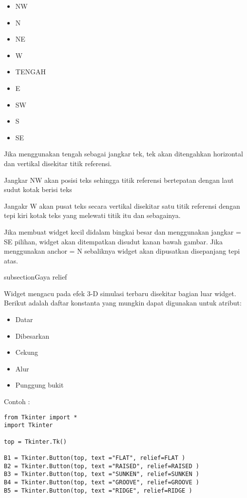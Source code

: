 \documentclass [12pt,a4paper,notitlepage,oneside,bahasa]{article}
\begin{document}
\begin{enumerate}
\begin{itemize}
\begin{itemize}
\begin{itemize}
		\item NW  
		\item N
		\item NE
		\item W
		\item TENGAH
		\item E
		\item SW
		\item S
		\item SE
	\end{itemize}
\end{itemize}
 \par
\vspace{12pt}
Jika menggunakan tengah sebagai jangkar tek, tek akan ditengahkan horizontal dan vertikal disekitar titik referensi. \par
Jangkar NW akan posisi teks sehingga titik referensi bertepatan dengan laut sudut kotak berisi teks \par
Jangakr W akan pusat teks secara vertikal disekitar satu titik referensi dengan tepi kiri kotak teks yang melewati titik itu dan sebagainya. \par
Jika membuat widget kecil didalam bingkai besar dan menggunakan jangkar = SE pilihan, widget akan ditempatkan disudut kanan bawah gambar. Jika menggunakan anchor = N sebaliknya widget akan dipusatkan disepanjang tepi atas. \par
\noindent 

subsection{Gaya relief}

Widget mengacu pada efek 3-D simulasi terbaru disekitar bagian luar widget. Berikut adalah daftar konstanta yang mungkin dapat digunakan untuk atribut:
\begin{itemize}
	\item Datar
	\item Dibesarkan
	\item Cekung
	\item Alur
	\item Punggung bukit
\end{itemize}


\vspace{12pt}
Contoh : \par
\begin{verbatim}
from Tkinter import *
import Tkinter

top = Tkinter.Tk()

B1 = Tkinter.Button(top, text ="FLAT", relief=FLAT )
B2 = Tkinter.Button(top, text ="RAISED", relief=RAISED )
B3 = Tkinter.Button(top, text ="SUNKEN", relief=SUNKEN )
B4 = Tkinter.Button(top, text ="GROOVE", relief=GROOVE )
B5 = Tkinter.Button(top, text ="RIDGE", relief=RIDGE )


\end{verbatim}
\end{itemize}
\end{enumerate}
\end{document}
